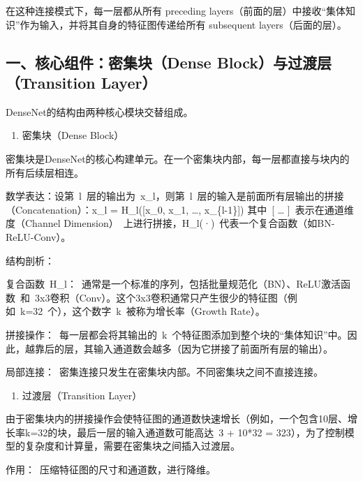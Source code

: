 在这种连接模式下，每一层都从所有 preceding layers（前面的层）中接收``集体知识''作为输入，并将其自身的特征图传递给所有 subsequent layers（后面的层）。

\hypertarget{ux4e00ux6838ux5fc3ux7ec4ux4ef6ux5bc6ux96c6ux5757dense-blockux4e0eux8fc7ux6e21ux5c42transition-layer}{%
\subsection{一、核心组件：密集块（Dense Block）与过渡层（Transition Layer）}\label{ux4e00ux6838ux5fc3ux7ec4ux4ef6ux5bc6ux96c6ux5757dense-blockux4e0eux8fc7ux6e21ux5c42transition-layer}}

DenseNet的结构由两种核心模块交替组成。

\begin{enumerate}
\def\labelenumi{\arabic{enumi}.}
\tightlist
\item
  密集块（Dense Block）
\end{enumerate}

密集块是DenseNet的核心构建单元。在一个密集块内部，每一层都直接与块内的所有后续层相连。

数学表达：设第~l~层的输出为~x\_l，则第~l~层的输入是前面所有层输出的拼接（Concatenation）：x\_l = H\_l({[}x\_0, x\_1, \ldots, x\_\{l-1\}{]})
其中~{[} \ldots{} {]}~表示在通道维度（Channel Dimension）~上进行拼接，H\_l(·)~代表一个复合函数（如BN-ReLU-Conv）。

结构剖析：

复合函数~H\_l：~通常是一个标准的序列，包括批量规范化（BN）、ReLU激活函数~和~3x3卷积（Conv）。这个3x3卷积通常只产生很少的特征图（例如~k=32~个），这个数字~k~被称为增长率（Growth Rate）。

拼接操作：~每一层都会将其输出的~k~个特征图添加到整个块的``集体知识''中。因此，越靠后的层，其输入通道数会越多（因为它拼接了前面所有层的输出）。

局部连接：~密集连接只发生在密集块内部。不同密集块之间不直接连接。

\begin{enumerate}
\def\labelenumi{\arabic{enumi}.}
\setcounter{enumi}{1}
\tightlist
\item
  过渡层（Transition Layer）
\end{enumerate}

由于密集块内的拼接操作会使特征图的通道数快速增长（例如，一个包含10层、增长率k=32的块，最后一层的输入通道数可能高达~3 + 10*32 = 323），为了控制模型的复杂度和计算量，需要在密集块之间插入过渡层。

作用：~压缩特征图的尺寸和通道数，进行降维。

